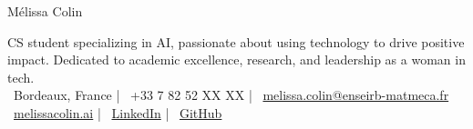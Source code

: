 \documentclass[10pt, letterpaper]{article}
\newenvironment{header}{
    \setlength{\topsep}{0pt}\par\kern\topsep\centering\linespread{1.5}
}{
    \par\kern\topsep
}
\begin{document}
    \begin{header}
        \fontsize{25 pt}{25 pt}\selectfont Mélissa Colin

        \vspace{5 pt}

        \normalsize
        \fontsize{13 pt}{13 pt}\selectfont CS student specializing in AI, passionate about using technology to drive positive impact. Dedicated to academic excellence, research, and leadership as a woman in tech.\\
        \normalsize
        \vspace{4pt}
        \faMapMarker*~Bordeaux, France \quad | \quad \faPhone*~+33 7 82 52 XX XX \quad | \quad \faEnvelope~\href{mailto:melissa.colin@enseirb-matmeca.fr}{melissa.colin@enseirb-matmeca.fr}\\
        \faGlobe~\href{https://melissacolin.ai}{melissacolin.ai} \quad | \quad \faLinkedin~\href{https://www.linkedin.com/in/m%C3%A9lissa-colin/}{LinkedIn} \quad | \quad \faGithub~\href{https://github.com/melissa-colin}{GitHub}
    \end{header}

\vspace{0.2cm}
\end{document}
